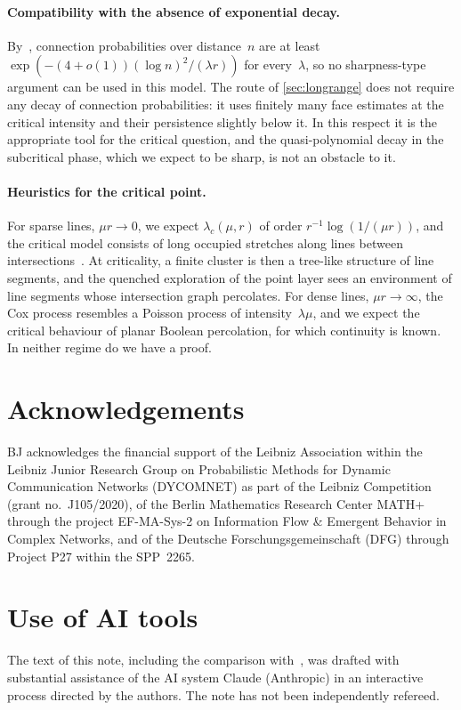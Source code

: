 \documentclass[11pt,letterpaper]{article}
\begin{document}
\paragraph{Compatibility with the absence of exponential decay.} By~\cite[Proposition~4.1]{HJ26sub}, connection probabilities over distance~$n$ are at least $\exp(-(4+o(1))(\log n)^2/(\lambda r))$ for every~$\lambda$, so no sharpness-type argument can be used in this model. The route of \cref{sec:longrange} does not require any decay of connection probabilities: it uses finitely many face estimates at the critical intensity and their persistence slightly below it. In this respect it is the appropriate tool for the critical question, and the quasi-polynomial decay in the subcritical phase, which we expect to be sharp, is not an obstacle to it.

\paragraph{Heuristics for the critical point.} For sparse lines, $\mu r\to0$, we expect $\lambda_c(\mu,r)$ of order $r^{-1}\log(1/(\mu r))$, and the critical model consists of long occupied stretches along lines between intersections~\cite[Section~7]{HJ26sub}. At criticality, a finite cluster is then a tree-like structure of line segments, and the quenched exploration of the point layer sees an environment of line segments whose intersection graph percolates. For dense lines, $\mu r\to\infty$, the Cox process resembles a Poisson process of intensity~$\lambda\mu$, and we expect the critical behaviour of planar Boolean percolation, for which continuity is known. In neither regime do we have a proof.

\section*{Acknowledgements}

BJ acknowledges the financial support of the Leibniz Association within the Leibniz Junior Research Group on Probabilistic Methods for Dynamic Communication Networks (DYCOMNET) as part of the Leibniz Competition (grant no.~J105/2020), of the Berlin Mathematics Research Center MATH+ through the project EF-MA-Sys-2 on Information Flow \& Emergent Behavior in Complex Networks, and of the Deutsche Forschungsgemeinschaft (DFG) through Project P27 within the SPP~2265.

\section*{Use of AI tools}

The text of this note, including the comparison with~\cite{Pei26}, was drafted with substantial assistance of the AI system Claude (Anthropic) in an interactive process directed by the authors. The note has not been independently refereed.



\end{document}
